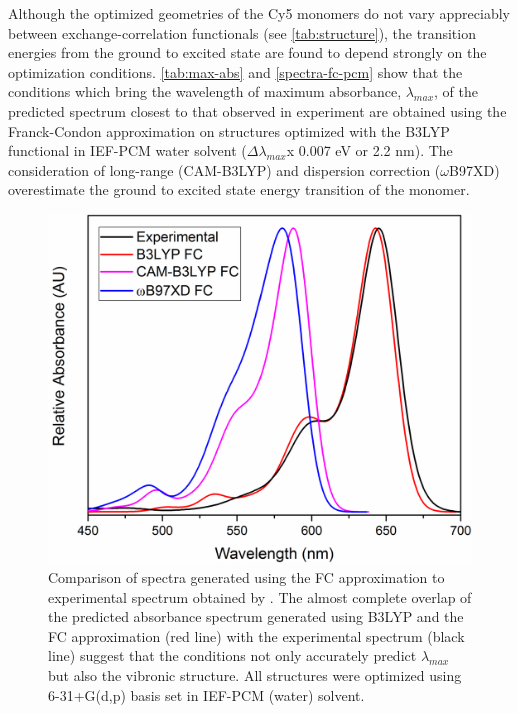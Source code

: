 Although the optimized geometries of the Cy5 monomers do not vary appreciably between exchange-correlation functionals (see \autoref{tab:structure}), the transition energies from the ground to excited state are found to depend strongly on the optimization conditions. \autoref{tab:max-abs} and \autoref{spectra-fc-pcm} show that the conditions which bring the wavelength of maximum absorbance, $\lambda_{max}$, of the predicted spectrum closest to that observed in experiment are obtained using the Franck-Condon approximation on structures optimized with the B3LYP functional in IEF-PCM water solvent ($\Delta\lambda_{max}$x 0.007 eV or 2.2 nm). The consideration of long-range (CAM-B3LYP) and dispersion correction ($\omega$B97XD) overestimate the ground to excited state energy transition of the monomer. 
\begin{figure}[h!]
    \centering
    \includegraphics[width=0.8\linewidth]{figures/pub1/FC-PCM.pdf}
    \caption{Comparison of spectra generated using the FC approximation to experimental spectrum obtained by \cite{Cannon2017}. The almost complete overlap of the predicted absorbance spectrum generated using B3LYP and the FC approximation (red line) with the experimental spectrum (black line) suggest that the conditions not only accurately predict $\lambda_{max}$ but also the vibronic structure. All structures were optimized using 6-31+G(d,p) basis set in IEF-PCM (water) solvent.}\label{spectra-fc-pcm}
\end{figure}

